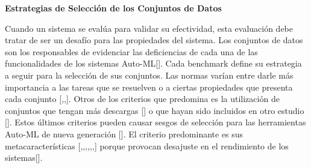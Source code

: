 \begin{flushleft} 
    {\large { \textbf{Estrategias de Selección de los Conjuntos de Datos}}}\label{subsection:sel_conj Auto-ML}
\end{flushleft}


Cuando un sistema se evalúa para validar su efectividad, esta evaluación debe tratar de ser un desafío para las propiedades del sistema. 
Los conjuntos de datos son los responsables de evidenciar las deficiencias de cada una de las funcionalidades de los sistemas Auto-ML[\cite{15}].
Cada benchmark define su estrategia a seguir para la selección de sus conjuntos.
Las normas varían entre darle más importancia a las tareas que se resuelven o a ciertas propiedades que presenta cada conjunto [\cite{26},\cite{32},\cite{18}]. 
Otros de los criterios que predomina es la utilización de conjuntos que tengan más descargas [\cite{19}] o que hayan sido incluidos en otro estudio [\cite{9}]. 
Estos últimos criterios pueden causar sesgos de selección para las herramientas Auto-ML de nueva generación [\cite{15}].
El criterio predominante es sus metacaracterísticas [\cite{10},\cite{15},\cite{28},\cite{11},\cite{27},\cite{17},\cite{16}] porque provocan desajuste en el 
rendimiento de los sistemas[\cite{10}].

